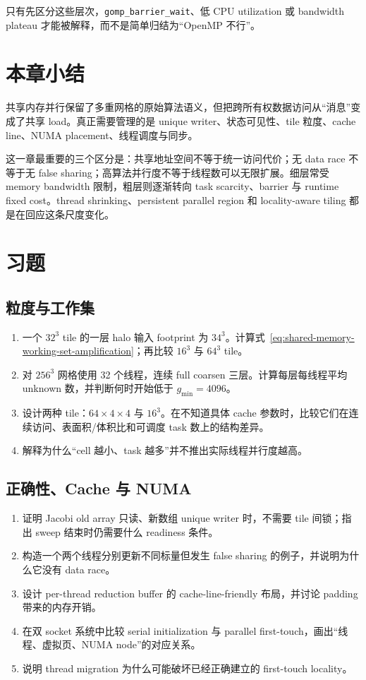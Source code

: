 只有先区分这些层次，\texttt{gomp\_barrier\_wait}、低 CPU utilization 或 bandwidth plateau 才能被解释，而不是简单归结为“OpenMP 不行”。

\section{本章小结}

共享内存并行保留了多重网格的原始算法语义，但把跨所有权数据访问从“消息”变成了共享 load。真正需要管理的是 unique writer、状态可见性、tile 粒度、cache line、NUMA placement、线程调度与同步。

这一章最重要的三个区分是：共享地址空间不等于统一访问代价；无 data race 不等于无 false sharing；高算法并行度不等于线程数可以无限扩展。细层常受 memory bandwidth 限制，粗层则逐渐转向 task scarcity、barrier 与 runtime fixed cost。thread shrinking、persistent parallel region 和 locality-aware tiling 都是在回应这条尺度变化。

\section*{习题}

\subsection*{粒度与工作集}
\begin{enumerate}[label=\arabic*.]
\item 一个 $32^3$ tile 的一层 halo 输入 footprint 为 $34^3$。计算式~\eqref{eq:shared-memory-working-set-amplification}；再比较 $16^3$ 与 $64^3$ tile。
\item 对 $256^3$ 网格使用 32 个线程，连续 full coarsen 三层。计算每层每线程平均 unknown 数，并判断何时开始低于 $g_{\min}=4096$。
\item 设计两种 tile：$64\times4\times4$ 与 $16^3$。在不知道具体 cache 参数时，比较它们在连续访问、表面积/体积比和可调度 task 数上的结构差异。
\item 解释为什么“cell 越小、task 越多”并不推出实际线程并行度越高。
\end{enumerate}

\subsection*{正确性、Cache 与 NUMA}
\begin{enumerate}[label=\arabic*.]
\item 证明 Jacobi old array 只读、新数组 unique writer 时，不需要 tile 间锁；指出 sweep 结束时仍需要什么 readiness 条件。
\item 构造一个两个线程分别更新不同标量但发生 false sharing 的例子，并说明为什么它没有 data race。
\item 设计 per-thread reduction buffer 的 cache-line-friendly 布局，并讨论 padding 带来的内存开销。
\item 在双 socket 系统中比较 serial initialization 与 parallel first-touch，画出“线程、虚拟页、NUMA node”的对应关系。
\item 说明 thread migration 为什么可能破坏已经正确建立的 first-touch locality。
\end{enumerate}

